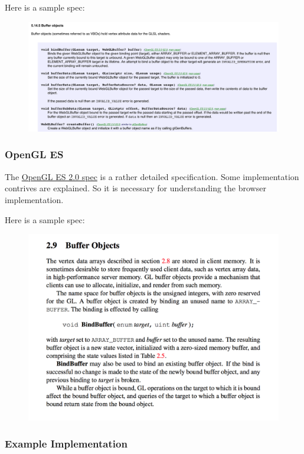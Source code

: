 Here is a sample spec:

\begin{figure}[htbp]
\centering
\includegraphics{webgl-spec.png}
\caption{}
\end{figure}

\subsubsection{OpenGL ES}\label{opengl-es}

The
\href{https://www.khronos.org/registry/gles/specs/2.0/es_full_spec_2.0.25.pdf}{OpenGL
ES 2.0 spec} is a rather detailed specification. Some implementation
contrives are explained. So it is necessary for understanding the
browser implementation.

Here is a sample spec:

\begin{figure}[htbp]
\centering
\includegraphics{opengl-spec.png}
\caption{}
\end{figure}

\subsubsection{Example Implementation}\label{example-implementation}

